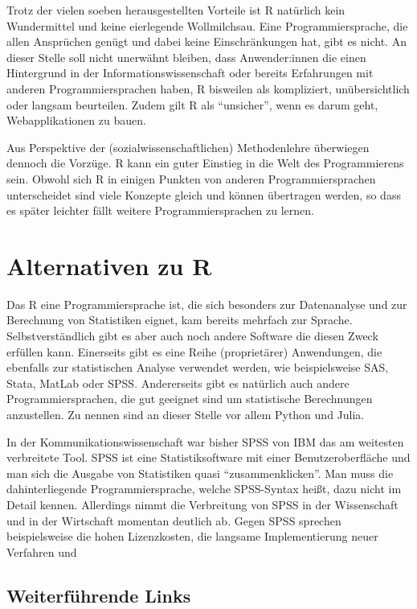 \documentclass[
]{book}
\begin{document}
Trotz der vielen soeben herausgestellten Vorteile ist R natürlich kein Wundermittel und keine eierlegende Wollmilchsau. Eine Programmiersprache, die allen Ansprüchen genügt und dabei keine Einschränkungen hat, gibt es nicht. An dieser Stelle soll nicht unerwähnt bleiben, dass Anwender:innen die einen Hintergrund in der Informationswissenschaft oder bereits Erfahrungen mit anderen Programmiersprachen haben, R bisweilen als kompliziert, unübersichtlich oder langsam beurteilen. Zudem gilt R als ``unsicher'', wenn es darum geht, Webapplikationen zu bauen.

Aus Perspektive der (sozialwissenschaftlichen) Methodenlehre überwiegen dennoch die Vorzüge.
R kann ein guter Einstieg in die Welt des Programmierens sein. Obwohl sich R in einigen Punkten von anderen Programmiersprachen unterscheidet sind viele Konzepte gleich und können übertragen werden, so dass es später leichter fällt weitere Programmiersprachen zu lernen.

\hypertarget{alternativen-zu-r}{%
\section{Alternativen zu R}\label{alternativen-zu-r}}

Das R eine Programmiersprache ist, die sich besonders zur Datenanalyse und zur Berechnung von
Statistiken eignet, kam bereits mehrfach zur Sprache. Selbstverständlich gibt es aber auch noch
andere Software die diesen Zweck erfüllen kann.
Einerseits gibt es eine Reihe (proprietärer) Anwendungen, die ebenfalls zur statistischen Analyse verwendet werden, wie beispielsweise SAS, Stata, MatLab oder SPSS.
Andererseits gibt es natürlich auch andere Programmiersprachen, die gut geeignet sind um statistische
Berechnungen anzustellen.
Zu nennen sind an dieser Stelle vor allem Python und Julia.

In der Kommunikationswissenschaft war bisher SPSS von IBM das am weitesten verbreitete Tool.
SPSS ist eine Statistiksoftware mit einer Benutzeroberfläche und man sich die Ausgabe von Statistiken quasi ``zusammenklicken''.
Man muss die dahinterliegende Programmiersprache, welche SPSS-Syntax heißt, dazu nicht im Detail kennen.
Allerdings nimmt die Verbreitung von SPSS in der Wissenschaft und in der Wirtschaft momentan
deutlich ab.
Gegen SPSS sprechen beispielsweise die hohen Lizenzkosten, die langsame Implementierung neuer Verfahren und

\hypertarget{weiterfuxfchrende-links-1}{%
\subsection*{Weiterführende Links}\label{weiterfuxfchrende-links-1}}
\end{document}
